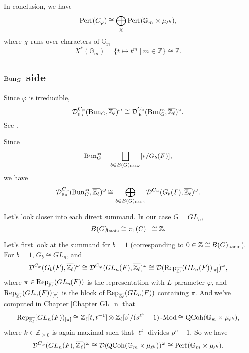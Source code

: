 In conclusion, we have 
$$\operatorname{\operatorname{Perf}}(C_{\varphi}) \cong \bigoplus_{\chi}\operatorname{\operatorname{Perf}}(\mathbb{G}_m \times \mu_{\ell^k}),$$
where $\chi$ runs over characters of $\mathbb{G}_m$ 
$$X^*(\mathbb{G}_m)=\{t \mapsto t^m \;|\; m \in \mathbb{Z}\} \cong \mathbb{Z}.$$


\subsection{$\operatorname{\operatorname{Bun}}_G$ side}

Since $\varphi$ is irreducible, 
$$\mathcal{D}^{C_{\varphi}}_{\operatorname{\operatorname{lis}}}(\operatorname{\operatorname{Bun}}_G, \overline{\mathbb{Z}_{\ell}})^{\omega} \cong \mathcal{D}^{C_{\varphi}}_{\operatorname{\operatorname{lis}}}(\operatorname{\operatorname{Bun}}_G^{\operatorname{\operatorname{ss}}}, \overline{\mathbb{Z}_{\ell}})^{\omega}.$$
See \cite[Section X.2]{fargues2021geometrization}.

Since
$$\operatorname{\operatorname{Bun}}_G^{\operatorname{\operatorname{ss}}}=\bigsqcup_{b \in B(G)_{\operatorname{\operatorname{basic}}}}[*/G_b(F)],$$
we have 
$$\mathcal{D}^{C_{\varphi}}_{\operatorname{\operatorname{lis}}}(\operatorname{\operatorname{Bun}}_G^{\operatorname{\operatorname{ss}}}, \overline{\mathbb{Z}_{\ell}})^{\omega} \cong \bigoplus_{b \in B(G)_{\operatorname{\operatorname{basic}}}}\mathcal{D}^{C_{\varphi}}(G_b(F), \overline{\mathbb{Z}_{\ell}})^{\omega}.$$

Let's look closer into each direct summand. In our case $G=GL_n$, 
$$B(G)_{\operatorname{\operatorname{basic}}} \cong \pi_1(G)_{\Gamma} \cong \mathbb{Z}.$$ 

Let's first look at the summand for $b=1$ (corresponding to $0 \in \mathbb{Z} \cong B(G)_{\operatorname{\operatorname{basic}}}$). For $b=1$, $G_b \cong GL_n$, and 
$$\mathcal{D}^{C_{\varphi}}(G_b(F), \overline{\mathbb{Z}_{\ell}})^{\omega} \cong \mathcal{D}^{C_{\varphi}}(GL_n(F), \overline{\mathbb{Z}_{\ell}})^{\omega} \cong \mathcal{D}(\operatorname{\operatorname{Rep}}_{\overline{\mathbb{Z}_{\ell}}}(GL_n(F))_{[\pi]})^{\omega},$$
where $\pi \in \operatorname{\operatorname{Rep}}_{\overline{\mathbb{F}_{\ell}}}(GL_n(F))$ is the representation with $L$-parameter $\varphi$, and $\operatorname{\operatorname{Rep}}_{\overline{\mathbb{Z}_{\ell}}}(GL_n(F))_{[\pi]}$ is the block of $\operatorname{\operatorname{Rep}}_{\overline{\mathbb{Z}_{\ell}}}(GL_n(F))$ containing $\pi$.
And we've computed in Chapter \ref{Chapter GL_n} that
$$\operatorname{\operatorname{Rep}}_{\overline{\mathbb{Z}_{\ell}}}(GL_n(F))_{[\pi]} \cong \overline{\mathbb{Z}_{\ell}}[t, t^{-1}] \otimes \overline{\mathbb{Z}_{\ell}}[s]/(s^{\ell^k}-1)\operatorname{-Mod} \cong \operatorname{\operatorname{QCoh}}(\mathbb{G}_m \times \mu_{\ell^k}),$$
where $k \in \mathbb{Z}_{\geq 0}$ is again maximal such that $\ell^k$ divides $p^n-1$. So we have
$$\mathcal{D}^{C_{\varphi}}(GL_n(F), \overline{\mathbb{Z}_{\ell}})^{\omega} \cong \mathcal{D}(\operatorname{\operatorname{QCoh}}(\mathbb{G}_m \times \mu_{\ell^k}))^{\omega} \cong \operatorname{\operatorname{Perf}}(\mathbb{G}_m \times \mu_{\ell^k}).$$

